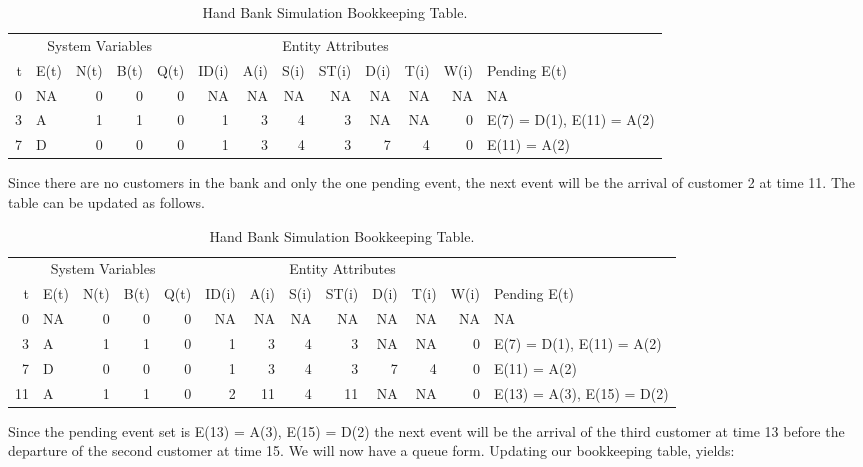 \documentclass[
]{book}
\theoremstyle{definition}
\theoremstyle{definition}
\theoremstyle{definition}
\theoremstyle{definition}
\theoremstyle{remark}
\begin{document}
\begin{table}

\caption{\label{tab:SQBH3}Hand Bank Simulation Bookkeeping Table.}
\centering
\fontsize{10}{12}\selectfont
\begin{tabular}[t]{rlrrrrrrrrrrl}
\toprule
\multicolumn{5}{c}{System Variables} & \multicolumn{7}{c}{Entity Attributes} & \multicolumn{1}{c}{ } \\
\cmidrule(l{3pt}r{3pt}){1-5} \cmidrule(l{3pt}r{3pt}){6-12}
t & E(t) & N(t) & B(t) & Q(t) & ID(i) & A(i) & S(i) & ST(i) & D(i) & T(i) & W(i) & Pending E(t)\\
\midrule
0 & NA & 0 & 0 & 0 & NA & NA & NA & NA & NA & NA & NA & NA\\
3 & A & 1 & 1 & 0 & 1 & 3 & 4 & 3 & NA & NA & 0 & E(7) = D(1), E(11) = A(2)\\
7 & D & 0 & 0 & 0 & 1 & 3 & 4 & 3 & 7 & 4 & 0 & E(11) = A(2)\\
\bottomrule
\end{tabular}
\end{table}

Since there are no customers in the bank and only the one pending event,
the next event will be the arrival of customer 2 at time 11. The table
can be updated as follows.

\begin{table}

\caption{\label{tab:SQBH4}Hand Bank Simulation Bookkeeping Table.}
\centering
\fontsize{10}{12}\selectfont
\begin{tabular}[t]{rlrrrrrrrrrrl}
\toprule
\multicolumn{5}{c}{System Variables} & \multicolumn{7}{c}{Entity Attributes} & \multicolumn{1}{c}{ } \\
\cmidrule(l{3pt}r{3pt}){1-5} \cmidrule(l{3pt}r{3pt}){6-12}
t & E(t) & N(t) & B(t) & Q(t) & ID(i) & A(i) & S(i) & ST(i) & D(i) & T(i) & W(i) & Pending E(t)\\
\midrule
0 & NA & 0 & 0 & 0 & NA & NA & NA & NA & NA & NA & NA & NA\\
3 & A & 1 & 1 & 0 & 1 & 3 & 4 & 3 & NA & NA & 0 & E(7) = D(1), E(11) = A(2)\\
7 & D & 0 & 0 & 0 & 1 & 3 & 4 & 3 & 7 & 4 & 0 & E(11) = A(2)\\
11 & A & 1 & 1 & 0 & 2 & 11 & 4 & 11 & NA & NA & 0 & E(13) = A(3), E(15) = D(2)\\
\bottomrule
\end{tabular}
\end{table}

Since the pending event set is E(13) = A(3), E(15) = D(2) the next event
will be the arrival of the third customer at time 13 before the
departure of the second customer at time 15. We will now have a queue
form. Updating our bookkeeping table, yields:
\end{document}
